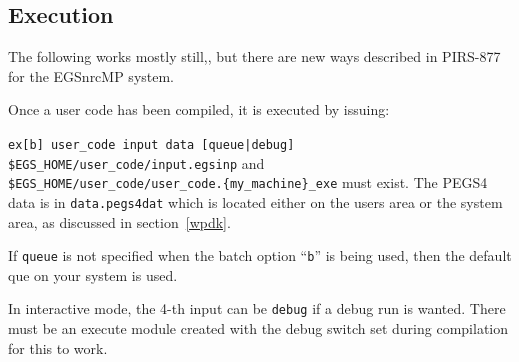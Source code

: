 %



\subsection{Execution}
\label{Execution}

The following works mostly still,, but there are new ways described in
PIRS-877\cite{Ka03} for the EGSnrcMP system.


Once a user code has been compiled, it is executed by issuing:

\hspace*{1cm}\verb+ex[b] user_code input data [queue|debug]+\vspace*{5mm}\\
\verb+$EGS_HOME/user_code/input.egsinp+ and\\
\verb+$EGS_HOME/user_code/user_code.{my_machine}_exe+ must exist.  The
PEGS4 data is in \verb+data.pegs4dat+ which is located either on
the users area or the system area, as discussed in section~\ref{wpdk}.

If \verb+queue+ is not specified when the batch option ``{\tt b}'' is being
used, then the default que on your system is used.

In interactive mode, the 4-th input can be \verb+debug+ if a debug run
is wanted.  There must be an execute module created with the debug
switch set during compilation for this to work.


